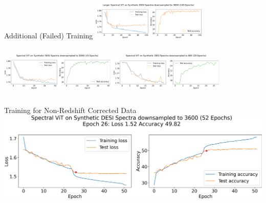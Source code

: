 
\begin{frame}{Additional (Failed) Training}
\centering
\includegraphics[width=5.5cm]{figures/v1_real/vit_model_V1_bigtraining_new.png}\\
\begin{columns}[t]
\centering
\includegraphics[width=5.5cm]{figures/vit_model_V1.2training_new.png}
\centering
\includegraphics[width=5.5cm]{figures/vit_model_V1.3_muchsmallermodeltraining_new.png}\\
\end{columns}
\end{frame}


\begin{frame}{Training for Non-Redshift Corrected Data}
\centering
\includegraphics[width=.85\linewidth]{figures/v2_real/vit_model_V2training_new.png}
\end{frame}


